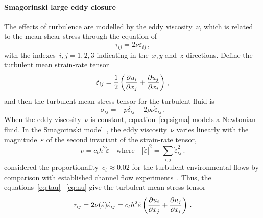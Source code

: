 \documentclass[12pt,a5paper]{article}
\newcommand{\ros}{{\dot\varepsilon}}
\begin{document}
\paragraph{Smagorinski large eddy closure} The effects of turbulence are modelled by the eddy viscosity~$\nu$, which is related to the mean shear stress through the equation of
\begin{equation}
\tau_{ij}=2\nu\ros_{ij}\,,\label{eq:tau}
\end{equation}
with the indexes~$i,j=1,2,3$ indicating in the~$x, y$ and~$z$ directions. Define the turbulent mean strain-rate tensor~\cite[e.g.]{Roberts2008,Georgiev2008}
\begin{equation}
	\ros_{ij} =\frac12\left( \D{x_j}{u_i} +\D{x_i}{u_j}\right) \,,\label{eq:strainrate}
\end{equation}
and then the turbulent mean stress tensor for the turbulent fluid is
\begin{equation}
\sigma_{ij}=-p\delta_{ij}+2\rho\nu\ros_{ij}\,.\label{eq:sigma}
\end{equation}
When the eddy viscosity~$\nu$ is constant, equation~\eqref{eq:sigma} models a Newtonian fluid. In the Smagorinski model~\cite[e.g.]{Ozgokmen2007a}, the eddy viscosity~$\nu$ varies linearly with the magnitude~$\ros$ of the second invariant of the strain-rate tensor,
\begin{equation}
  \nu=c_th^2\ros\quad\text{where}\quad |\ros|^2=\sum_{i,j}\ros_{ij}^2\,.\label{eq:nu}
\end{equation}
\cite{Roberts2008} considered the proportionality~$c_t\approx0.02$ for the turbulent environmental flows by comparison with established channel flow experiments~\cite[e.g.]{Nezu2005}. Thus, the equations~\eqref{eq:tau}$-$\eqref{eq:nu} give the turbulent mean stress tensor
\begin{equation}
\tau_{ij}=2\nu(\ros)\ros_{ij}=c_th^2\ros\left( \D{x_j}{u_i} +\D{x_i}{u_j}\right) \,.\label{eq:stress}
\end{equation}
\end{document}

